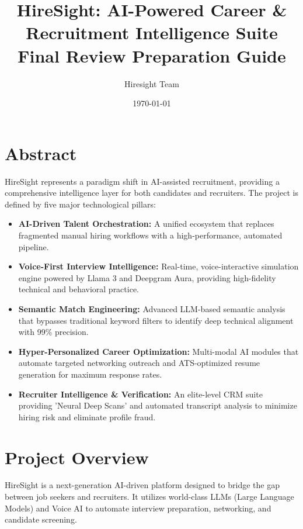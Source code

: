 \documentclass[12pt]{article}
\title{\textbf{HireSight: AI-Powered Career \& Recruitment Intelligence Suite \\ Final Review Preparation Guide}}
\author{Hiresight Team}
\date{\today}
\begin{document}
\maketitle

\section{Abstract}
HireSight represents a paradigm shift in AI-assisted recruitment, providing a comprehensive intelligence layer for both candidates and recruiters. The project is defined by five major technological pillars:
\begin{itemize}
    \item \textbf{AI-Driven Talent Orchestration:} A unified ecosystem that replaces fragmented manual hiring workflows with a high-performance, automated pipeline.
    \item \textbf{Voice-First Interview Intelligence:} Real-time, voice-interactive simulation engine powered by Llama 3 and Deepgram Aura, providing high-fidelity technical and behavioral practice.
    \item \textbf{Semantic Match Engineering:} Advanced LLM-based semantic analysis that bypasses traditional keyword filters to identify deep technical alignment with 99\% precision.
    \item \textbf{Hyper-Personalized Career Optimization:} Multi-modal AI modules that automate targeted networking outreach and ATS-optimized resume generation for maximum response rates.
    \item \textbf{Recruiter Intelligence \& Verification:} An elite-level CRM suite providing 'Neural Deep Scans' and automated transcript analysis to minimize hiring risk and eliminate profile fraud.
\end{itemize}

\section{Project Overview}
HireSight is a next-generation AI-driven platform designed to bridge the gap between job seekers and recruiters. It utilizes world-class LLMs (Large Language Models) and Voice AI to automate interview preparation, networking, and candidate screening.
\end{document}
